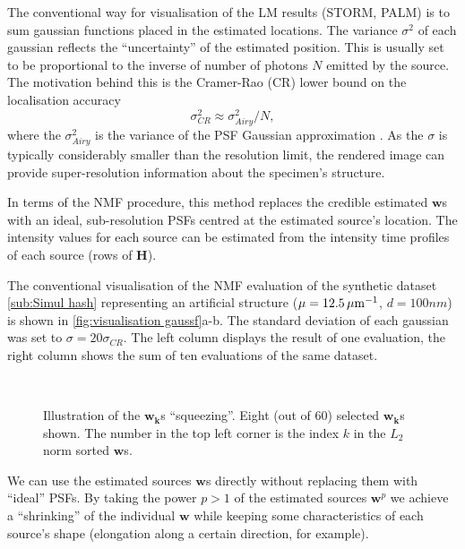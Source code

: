 The conventional way for visualisation of the LM results (STORM, PALM) is to sum gaussian functions placed in the estimated locations. The variance $\sigma^{2}$ of each gaussian reflects the ``uncertainty'' of the estimated position. This is usually set to be proportional to the inverse of number of photons $N$ emitted by the source. The motivation behind this is the Cramer-Rao (CR) lower bound on the localisation accuracy 
%
\begin{equation}
	\sigma_{CR}^{2} \approx \sigma_{Airy}^{2}/N,
\end{equation}
%
where the  $\sigma_{Airy}^{2}$ is the variance of the PSF Gaussian approximation . As the $\sigma$ is typically considerably smaller than the resolution limit, the rendered image can provide super-resolution information about the specimen's structure. 
	
In terms of the NMF procedure, this method replaces the credible estimated $\bm{w}$s with an ideal, sub-resolution PSFs centred at the estimated source's location. The intensity values for each source can be estimated from the intensity time profiles of each source (rows of $\bm{H}$). 

The conventional visualisation of the NMF evaluation of the synthetic dataset \autoref{sub:Simul hash} representing an artificial structure ($\mu = 12.5\, \mathrm{\mu m}^{-1}$, $d=100 \unit{nm}$) is shown in \autoref{fig:visualisation gaussf}a-b. The standard deviation of each gaussian was set to $\sigma=20\sigma_{CR}$. The left column displays the result of one evaluation, the right column shows the sum of ten evaluations of the same dataset.

\begin{figure}[!hbt]
	\newcommand{\sizef}{.8}			
	\newcommand{\widthfig}{1\textwidth}	
	\centering
	\\
	\caption{Illustration of the $\bm{w_{k}}$s ``squeezing''. Eight (out of 60) selected $\bm{w_{k}}$s  shown. The number in the top left corner is the index $k$ in the $L_{2}$ norm sorted $\bm{w}$s.}
	\label{fig:demo pow w}	
\end{figure}

We can use the estimated sources $\bm{w}$s directly without replacing them with ``ideal'' PSFs. By taking the power $p>1$ of the estimated sources $\bm{w}^{p}$ we achieve a ``shrinking'' of the individual $\bm{w}$ while keeping some characteristics of each source's shape (elongation along a certain direction, for example). 

